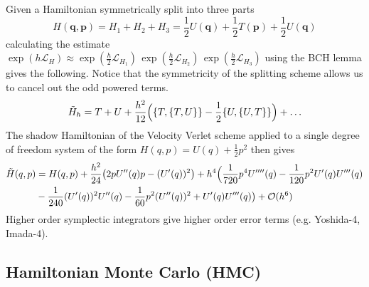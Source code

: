      Given a Hamiltonian symmetrically split into three parts
      \begin{equation}
        H(\mathbf{q}, \mathbf{p}) =  H_1 + H_2 + H_3 = \frac{1}{2} U(\mathbf{q}) + \frac{1}{2} T(\mathbf{p}) + \frac{1}{2} U(\mathbf{q})
      \end{equation}
      calculating the estimate $\exp{(h \mathcal{L}_H)} \approx \exp(\frac{h}{2} \mathcal{L}_{H_1})\,\exp(\frac{h}{2} \mathcal{L}_{H_2})\,\exp(\frac{h}{2} \mathcal{L}_{H_3})$ using the BCH lemma gives the following. Notice that the symmetricity of the splitting scheme allows us to cancel out the odd powered terms. 
      \begin{equation}
        \Tilde{H}_h = T + U + \frac{h^2}{12} \Big( \{ T, \{T, U\}\} - \frac{1}{2} \{U, \{U, T\}\} \Big) + \ldots
      \end{equation}
      The shadow Hamiltonian of the Velocity Verlet scheme applied to a single degree of freedom system of the form $H(q, p) = U(q) + \frac{1}{2} p^2$ then gives 
      \begin{align*}
        \Tilde{H}(q, p) & = H(q, p) + \frac{h^2}{24} \big(2 p U'' (q) p - (U^\prime (q))^2 \big) + h^4 \Big( \frac{1}{720} p^4 U''''(q) - \frac{1}{120} p^2 U'(q) U'''(q) \\
        & - \frac{1}{240} (U'(q))^2 U''(q) - \frac{1}{60} p^2 (U''(q))^2 + U'(q) U'''(q) \big) + \mathcal{O}(h^6) 
      \end{align*}
      Higher order symplectic integrators give higher order error terms (e.g. Yoshida-4, Imada-4). 
  
  \subsection{Hamiltonian Monte Carlo (HMC)}

